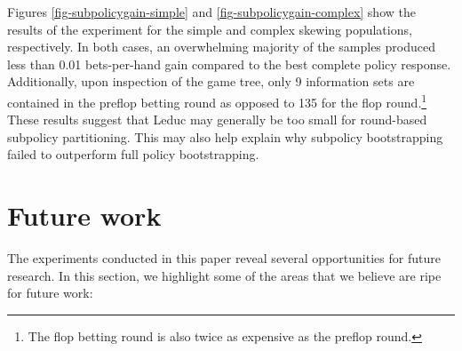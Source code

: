 \documentclass{aamas2013}
\begin{document}
Figures \ref{fig-subpolicygain-simple} and \ref{fig-subpolicygain-complex} show the results of the experiment for the simple and complex skewing populations, respectively. In both cases, an overwhelming majority of the samples produced less than 0.01 bets-per-hand gain compared to the best complete policy response. Additionally, upon inspection of the game tree, only 9 information sets are contained in the preflop betting round as opposed to 135 for the flop round.\footnote{The flop betting round is also twice as expensive as the preflop round.} These results suggest that Leduc may generally be too small for round-based subpolicy partitioning. This may also help explain why subpolicy bootstrapping failed to outperform full policy bootstrapping.

\section{Future work}
The experiments conducted in this paper reveal several opportunities for future research. In this section, we highlight some of the areas that we believe are ripe for future work:
\end{document}
